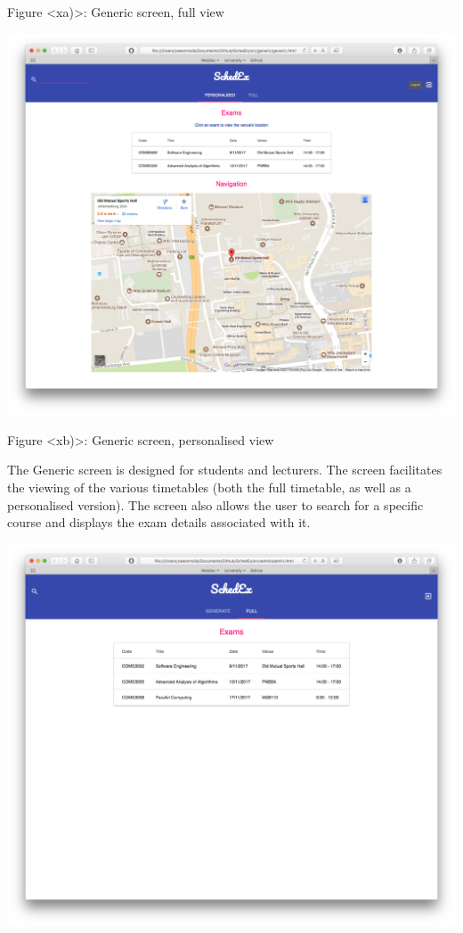 \documentclass{article}
\begin{document}
Figure <xa)>: Generic screen, full view

\centerline{\includegraphics[scale=0.4]{generic_personalised}}

Figure <xb)>: Generic screen, personalised view

The Generic screen is designed for students and lecturers. The screen facilitates the viewing of the various timetables (both the full timetable, as well as a personalised version). The screen also allows the user to search for a specific course and displays the exam details associated with it.

\centerline{\includegraphics[scale=0.4]{admin_full}}
\end{document}
